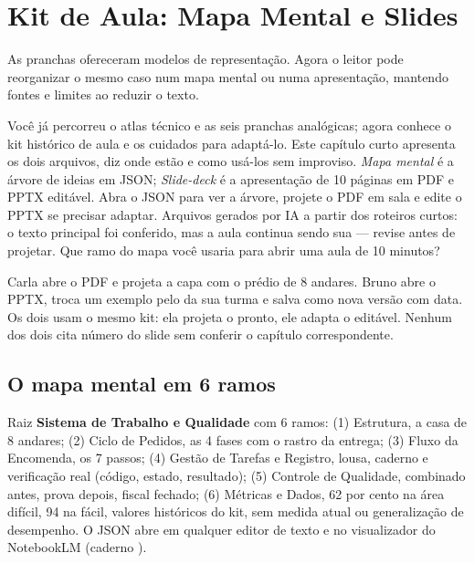 \chapter{Kit de Aula: Mapa Mental e Slides}

As pranchas ofereceram modelos de representação. Agora o leitor pode reorganizar o mesmo caso num mapa mental ou numa apresentação, mantendo fontes e limites ao reduzir o texto.


\roteirodidatico
{Você já percorreu o atlas técnico e as seis pranchas analógicas; agora conhece o kit histórico de aula e os cuidados para adaptá-lo. Este capítulo curto apresenta os dois arquivos, diz onde estão e como usá-los sem improviso.}
{\emph{Mapa mental} é a árvore de ideias em JSON; \emph{Slide-deck} é a apresentação de 10 páginas em PDF e PPTX editável.}
{Abra o JSON para ver a árvore, projete o PDF em sala e edite o PPTX se precisar adaptar.}
{Arquivos gerados por IA a partir dos roteiros curtos: o texto principal foi conferido, mas a aula continua sendo sua — revise antes de projetar.}
{Que ramo do mapa você usaria para abrir uma aula de 10 minutos?}

{Carla abre o PDF e projeta a capa com o prédio de 8 andares. Bruno abre o PPTX, troca um exemplo pelo da sua turma e salva como nova versão com data. Os dois usam o mesmo kit: ela projeta o pronto, ele adapta o editável. Nenhum dos dois cita número do slide sem conferir o capítulo correspondente.}

\section{O mapa mental em 6 ramos}


\begin{descricao}
Raiz \textbf{Sistema de Trabalho e Qualidade} com 6 ramos: (1) Estrutura, a casa de 8 andares; (2) Ciclo de Pedidos, as 4 fases com o rastro da entrega; (3) Fluxo da Encomenda, os 7 passos; (4) Gestão de Tarefas e Registro, lousa, caderno e verificação real (código, estado, resultado); (5) Controle de Qualidade, combinado antes, prova depois, fiscal fechado; (6) Métricas e Dados, 62 por cento na área difícil, 94 na fácil, valores históricos do kit, sem medida atual ou generalização de desempenho. O JSON abre em qualquer editor de texto e no visualizador do NotebookLM (caderno ).
\end{descricao}


